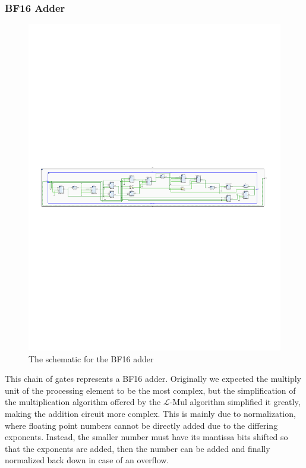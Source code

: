 \documentclass[12pt,letterpaper]{article}
\newcommand{\lmul}{$\mathcal{L}$-Mul\xspace}
\begin{document}
\subsubsection*{BF16 Adder}

\begin{figure}[h]
    \centering
    \includegraphics[clip, trim=0.5cm 11cm 0.5cm 11cm, width=1.00\textwidth]{Verilog Schematics/adder.pdf}
    \caption{The schematic for the BF16 adder}
    \label{fig:systolic}
\end{figure}

This chain of gates represents a BF16 adder.  Originally we expected the multiply unit of the processing element to be the most complex, but the simplification of the multiplication algorithm offered by the \lmul algorithm simplified it greatly, making the addition circuit more complex.  This is mainly due to normalization, where floating point numbers cannot be directly added due to the differing exponents. Instead, the smaller number must have its mantissa bits shifted so that the exponents are added, then the number can be added and finally normalized back down in case of an overflow.
\end{document}
